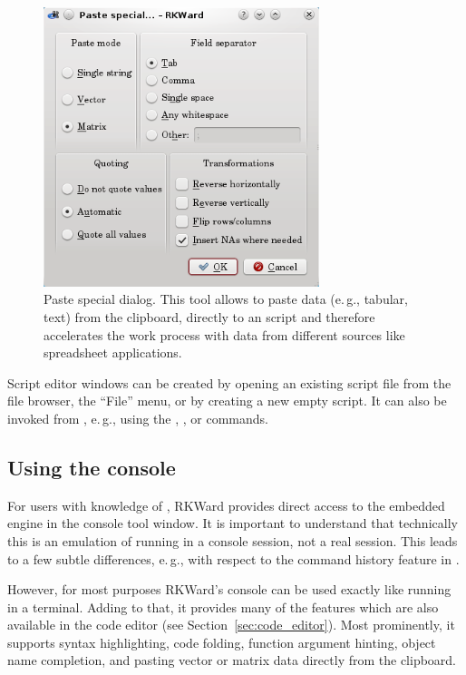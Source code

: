 \begin{figure}[t!]
 \centering
 \includegraphics[width=8.043cm]{../figures/special_paste.png}
 \caption{Paste special dialog. This tool allows to paste data (e.\,g., tabular, text) from the clipboard, directly to an 
  script and therefore accelerates the work process with data from different sources 
 like spreadsheet applications.
}
 \label{fig:special_paste}
\end{figure}

Script editor windows can be created by opening an existing
 script file from the file browser, the
``File'' menu, or by creating a new empty script. It can
also be invoked from , e.\,g., using the
, , or 
commands.

\subsection[Using the R console]{Using the  console}
\label{sec:using_R_console}
For users with knowledge of , RKWard provides direct access to the
embedded  engine in the
 console tool window. It is important to understand that technically this is an
emulation of  running in a console
session, not a real  session. This leads to a few subtle
differences, e.\,g., with respect to the command history feature in
.

However, for most purposes RKWard's  console can be used exactly
like  running in a terminal. Adding to that, it provides many of the
features which are also available in the code editor (see Section~\ref{sec:code_editor}).
Most prominently, it supports syntax highlighting, code
folding, function argument hinting, object name completion, and pasting
vector or matrix data directly from the clipboard.

